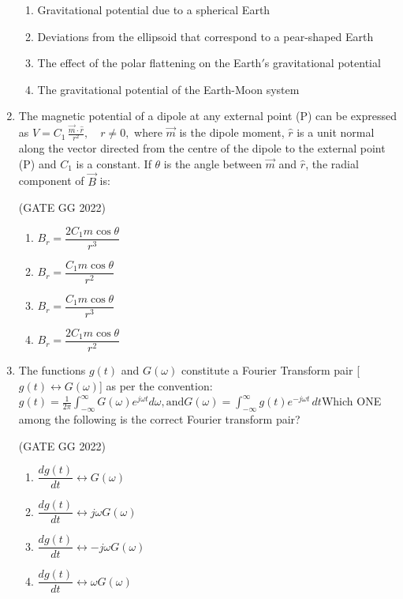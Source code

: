 \documentclass[journal]{IEEEtran}
\begin{document}
\begin{enumerate}
\begin{enumerate}
\item Gravitational potential due to a spherical Earth  
\item Deviations from the ellipsoid that correspond to a pear-shaped Earth  
\item The effect of the polar flattening on the Earth$'$s gravitational potential  
\item The gravitational potential of the Earth-Moon system  
\end{enumerate}

\item The magnetic potential of a dipole at any external point (P) can be expressed as  $V = C_1 \, \frac{\vec{m}\cdot \hat{r}}{r^2}, \quad r \neq 0,$
where $\vec{m}$ is the dipole moment, $\hat{r}$ is a unit normal along the vector directed from the centre of the dipole to the external point (P) and $C_1$ is a constant.  If $\theta$ is the angle between $\vec{m}$ and $\hat{r}$, the radial component of $\vec{B}$ is:  

\hfill(GATE GG 2022)
\begin{enumerate}
\item $B_r = \dfrac{2 C_1 m \cos\theta}{r^3}$  
\item $B_r = \dfrac{C_1 m \cos\theta}{r^2}$  
\item $B_r = \dfrac{C_1 m \cos\theta}{r^3}$  
\item $B_r = \dfrac{2 C_1 m \cos\theta}{r^2}$  
\end{enumerate}

\item The functions $g(t)$ and $G(\omega)$ constitute a Fourier Transform pair [$g(t) \leftrightarrow G(\omega)$] as per the convention:  
$g(t) = \frac{1}{2\pi} \int_{-\infty}^{\infty} G(\omega) e^{j \omega t} d\omega, \text{and}  G(\omega) = \int_{-\infty}^{\infty} g(t) e^{-j \omega t} \, dt
$Which ONE among the following is the correct Fourier transform pair?  

\hfill(GATE GG 2022)
\begin{enumerate}
\item $\dfrac{d g(t)}{dt} \leftrightarrow G(\omega)$  
\item $\dfrac{d g(t)}{dt} \leftrightarrow j \omega G(\omega)$  
\item $\dfrac{d g(t)}{dt} \leftrightarrow -j \omega G(\omega)$  
\item $\dfrac{d g(t)}{dt} \leftrightarrow \omega G(\omega)$  
\end{enumerate}


\end{enumerate}
\end{document}
